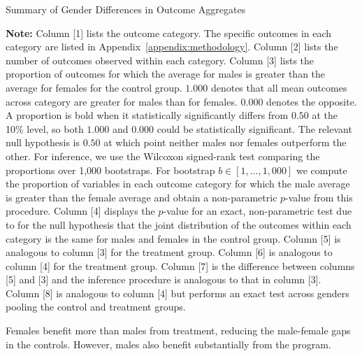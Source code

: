 \begin{sidewaystable}[!htbp]
\centering
\scriptsize
\begin{threeparttable}
\caption{Summary of Gender Differences in Outcome Aggregates} \label{table:summary}
 \label{tab:proportion-table-ranksign}
 
 \begin{tablenotes}
 \footnotesize
\item \textbf{Note:} Column [1] lists the outcome category. The specific outcomes in each category are listed in Appendix~\ref{appendix:methodology}. Column [2] lists the number of outcomes observed within each category. Column [3] lists the proportion of outcomes for which the average for males is greater than the average for females for the control group. $1.000$ denotes that all mean outcomes across category are greater for males than for females. $0.000$ denotes the opposite. A proportion is bold when it statistically significantly differs from $0.50$ at the 10\% level, so both $1.000$ and $0.000$ could be statistically significant. The relevant null hypothesis is $0.50$ at which point neither males nor females outperform the other. For inference, we use the Wilcoxon signed-rank test comparing the proportions over 1,000 bootstraps. For bootstrap $b \in [1, \ldots, 1,000]$ we compute the proportion of variables in each outcome category for which the male average is greater than the female average and obtain a non-parametric $p$-value from this procedure. Column [4] displays the $p$-value for an exact, non-parametric test due to \cite{Rosenbaum_2005_Distribution_JRSS} for the null hypothesis that the joint distribution of the outcomes within each category is the same for males and females in the control group. Column [5] is analogous to column [3] for the treatment group. Column [6] is analogous to column [4] for the treatment group. Column [7] is the difference between columns [5] and [3] and the inference procedure is analogous to that in column [3]. Column [8] is analogous to column [4] but performs an exact test across genders pooling the control and treatment groups.
\end{tablenotes}
\end{threeparttable}
\end{sidewaystable}

Females benefit more than males from treatment, reducing the male-female gaps in the controls. However, males also benefit substantially from the program.

